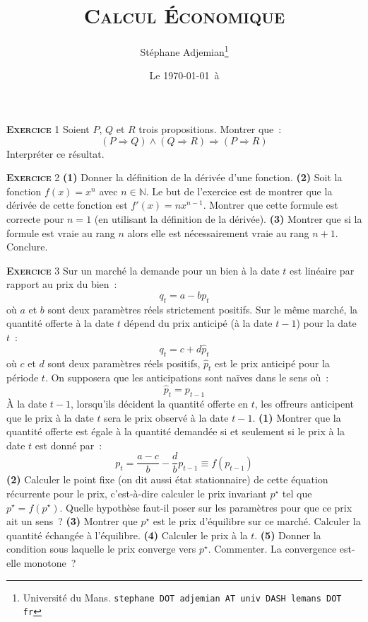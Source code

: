 \documentclass[10pt,a4paper,notitlepage]{article}
\newcommand{\exercice}[1]{\textsc{\textbf{Exercice}} #1}
\begin{document}
\title{\textsc{Calcul Économique}}
\author{Stéphane Adjemian\thanks{Université du Mans. \texttt{stephane DOT adjemian AT univ DASH lemans DOT fr}}}
\date{Le \today\ à \thistime}

\maketitle

\exercice{1} Soient $P$, $Q$ et $R$ trois propositions. Montrer que :
	\[
		(P \Rightarrow Q) \land (Q \Rightarrow R) \Rightarrow (P \Rightarrow R)
	\]
	Interpréter ce résultat.
	
\bigskip

\exercice{2} \textbf{(1)} Donner la définition de la dérivée d'une
fonction. \textbf{(2)} Soit la fonction $f(x) = x^n$ avec
$n\in\mathbb N$. Le but de l'exercice est de montrer que la dérivée de
cette fonction est $f'(x) = nx^{n-1}$. Montrer que cette formule est
correcte pour $n=1$ (en utilisant la définition de la
dérivée). \textbf{(3)} Montrer que si la formule est vraie au rang $n$
alors elle est nécessairement vraie au rang $n+1$. Conclure.

\bigskip

\exercice{3} Sur un marché la demande pour un bien à la date $t$ est linéaire par
rapport au prix du bien :
\[
q_t = a - b p_t
\]
où $a$ et $b$ sont deux paramètres réels strictement positifs. Sur le même marché,
la quantité offerte à la date $t$ dépend du prix anticipé (à la date
$t-1$) pour la date $t$ :
\[
q_t = c + d \hat p_t
\]
où $c$ et $d$ sont deux paramètres réels positifs, $\hat p_t$ est le
prix anticipé pour la période $t$. On supposera que les anticipations
sont naïves dans le sens où :
\[
\hat p_t = p_{t-1}
\]
À la date $t-1$, lorsqu'ils décident la quantité offerte en $t$, les offreurs anticipent que le prix à la date $t$ sera le prix observé
à la date $t-1$. \textbf{(1)} Montrer que la quantité offerte est
égale à la quantité demandée si et seulement si le prix à la date $t$
est donné par :
\[
p_t = \frac{a-c}{b} - \frac{d}{b} p_{t-1} \equiv f(p_{t-1})
\]
\textbf{(2)} Calculer le point fixe (on dit aussi état stationnaire)
de cette équation récurrente pour le prix, c'est-à-dire calculer le
prix invariant $p^{\star}$ tel que $p^{\star} = f(p^{\star})$. Quelle hypothèse
faut-il poser sur les paramètres pour que ce prix ait un sens ? \textbf{(3)}
Montrer que $p^{\star}$ est le prix d'équilibre sur ce
marché. Calculer la quantité échangée à l'équilibre. \textbf{(4)}
Calculer le prix à la $t$. \textbf{(5)} Donner la condition sous
laquelle le prix converge vers $p^{\star}$. Commenter. La convergence
est-elle monotone ?
\end{document}
